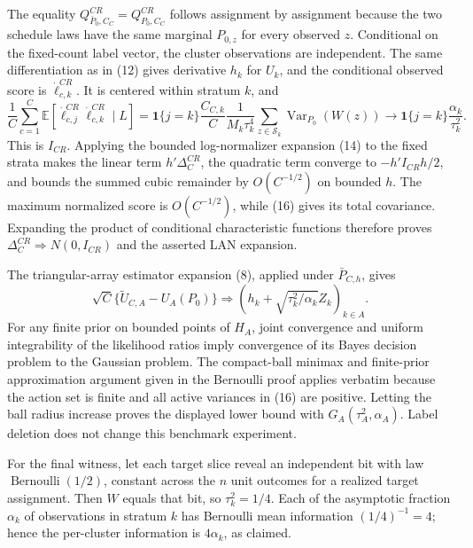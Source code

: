 The equality \(Q^{CR}_{\bar P_0,C_C}=Q^{CR}_{P_0,C_C}\) follows assignment by assignment because the two schedule laws have the same marginal \(P_{0,z}\) for every observed \(z\).  Conditional on the fixed-count label vector, the cluster observations are independent.  The same differentiation as in (12) gives derivative \(h_k\) for \(U_k\), and the conditional observed score is \(\dot\ell_{c,k}^{CR}\).  It is centered within stratum \(k\), and
\[
 \frac1C\sum_{c=1}^C\mathbb E[\dot\ell_{c,j}^{CR}\dot\ell_{c,k}^{CR}\mid L]
 ={\mathbf 1}\{j=k\}\frac{C_{C,k}}C\frac1{M_k\tau_k^4}
 \sum_{z\in\mathcal S_k}\operatorname{Var}_{P_0}(W(z))
 \longrightarrow{\mathbf 1}\{j=k\}\frac{\alpha_k}{\tau_k^2}. \tag{16}
\]
This is \(I_{CR}\).  Applying the bounded log-normalizer expansion (14) to the fixed strata makes the linear term \(h'\Delta_C^{CR}\), the quadratic term converge to \(-h'I_{CR}h/2\), and bounds the summed cubic remainder by \(O(C^{-1/2})\) on bounded \(h\).  The maximum normalized score is \(O(C^{-1/2})\), while (16) gives its total covariance.  Expanding the product of conditional characteristic functions therefore proves \(\Delta_C^{CR}\Rightarrow N(0,I_{CR})\) and the asserted LAN expansion.

The triangular-array estimator expansion (8), applied under \(\bar P_{C,h}\), gives
\[
 \sqrt C\{\widetilde U_{C,A}-U_A(P_0)\}\Rightarrow
 (h_k+\sqrt{\tau_k^2/\alpha_k}Z_k)_{k\in A}. \tag{17}
\]
For any finite prior on bounded points of \(H_A\), joint convergence and uniform integrability of the likelihood ratios imply convergence of its Bayes decision problem to the Gaussian problem.  The compact-ball minimax and finite-prior approximation argument given in the Bernoulli proof applies verbatim because the action set is finite and all active variances in (16) are positive.  Letting the ball radius increase proves the displayed lower bound with \(G_A(\tau_A^2,\alpha_A)\).  Label deletion does not change this benchmark experiment.

For the final witness, let each target slice reveal an independent bit with law \(\operatorname{Bernoulli}(1/2)\), constant across the \(n\) unit outcomes for a realized target assignment.  Then \(W\) equals that bit, so \(\tau_k^2=1/4\).  Each of the asymptotic fraction \(\alpha_k\) of observations in stratum \(k\) has Bernoulli mean information \((1/4)^{-1}=4\); hence the per-cluster information is \(4\alpha_k\), as claimed.